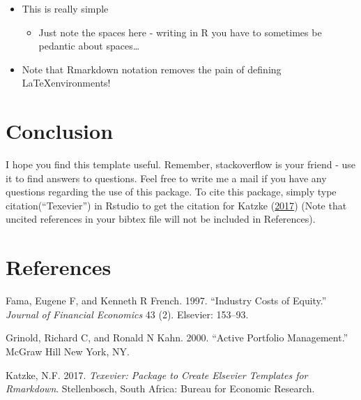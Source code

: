 \documentclass[11pt,preprint, authoryear]{elsarticle}
\numberwithin{equation}{section}
\numberwithin{figure}{section}
\numberwithin{table}{section}
\def\tightlist{} %
\begin{document}
\begin{itemize}
\item
  This is really simple

  \begin{itemize}
  \tightlist
  \item
    Just note the spaces here - writing in R you have to sometimes be
    pedantic about spaces\ldots{}
  \end{itemize}
\item
  Note that Rmarkdown notation removes the pain of defining
  \LaTeX environments!
\end{itemize}

\section{Conclusion}\label{conclusion}

I hope you find this template useful. Remember, stackoverflow is your
friend - use it to find answers to questions. Feel free to write me a
mail if you have any questions regarding the use of this package. To
cite this package, simply type citation(``Texevier'') in Rstudio to get
the citation for Katzke (\protect\hyperlink{ref-Texevier}{2017}) (Note
that uncited references in your bibtex file will not be included in
References).

\section*{References}\label{references}

\hypertarget{refs}{}
\hypertarget{ref-fama1997}{}
Fama, Eugene F, and Kenneth R French. 1997. ``Industry Costs of
Equity.'' \emph{Journal of Financial Economics} 43 (2). Elsevier:
153--93.

\hypertarget{ref-grinold2000}{}
Grinold, Richard C, and Ronald N Kahn. 2000. ``Active Portfolio
Management.'' McGraw Hill New York, NY.

\hypertarget{ref-Texevier}{}
Katzke, N.F. 2017. \emph{Texevier: Package to Create Elsevier Templates
for Rmarkdown}. Stellenbosch, South Africa: Bureau for Economic
Research.

\newpage
\nocite{*}

\end{document}
